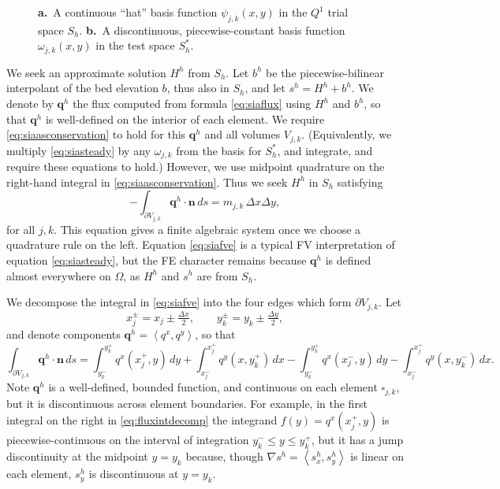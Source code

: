 \documentclass[twocolumn]{igs}
\newcommand\bn{\mathbf{n}}
\newcommand\bq{\mathbf{q}}
\newcommand{\grad}{\nabla}
\newcommand{\ip}[2]{\ensuremath{\left<#1,#2\right>}}
\newcommand{\dxtwo}{\tfrac{\Delta x}{2}}
\newcommand{\dytwo}{\tfrac{\Delta y}{2}}
\begin{document}
\begin{figure}[ht]
\begin{center}
 \quad 
\end{center}
\caption{{\large \textbf{a.}}~A continuous ``hat'' basis function $\psi_{j,k}(x,y)$ in the $Q^1$ trial space $S_h$.  {\large \textbf{b.}}~A discontinuous, piecewise-constant basis function $\omega_{j,k}(x,y)$ in the test space $S_h^*$.}
\label{fig:fembases}
\end{figure}

We seek an approximate solution $H^h$ from $S_h$.  Let $b^h$ be the piecewise-bilinear interpolant of the bed elevation $b$, thus also in $S_h$, and let $s^h=H^h+b^h$.  We denote by $\bq^h$ the flux computed from formula \eqref{eq:siaflux} using $H^h$ and $b^h$, so that $\bq^h$ is well-defined on the interior of each element.  We require \eqref{eq:siaasconservation} to hold for this $\bq^h$ and all volumes $V_{j,k}$.  (Equivalently, we multiply \eqref{eq:siasteady} by any $\omega_{j,k}$ from the basis for $S_h^*$, and integrate, and require these equations to hold.)  However, we use midpoint quadrature on the right-hand integral in \eqref{eq:siaasconservation}.  Thus we seek $H^h$ in $S_h$ satisfying
\begin{equation}
  - \int_{\partial V_{j,k}} \bq^h \cdot \bn\,ds = m_{j,k}\, \Delta x \Delta y, \label{eq:siafve}
\end{equation}
for all $j,k$.  This equation gives a finite algebraic system once we choose a quadrature rule on the left.  Equation \eqref{eq:siafve} is a typical FV interpretation of equation \eqref{eq:siasteady}, but the FE character remains because $\bq^h$ is defined almost everywhere on $\Omega$, as $H^h$ and $s^h$ are from $S_h$.

We decompose the integral in \eqref{eq:siafve} into the four edges which form $\partial V_{j,k}$.  Let
\begin{equation}
x_j^\pm = x_j \pm \dxtwo, \qquad y_k^\pm = y_k \pm \dytwo, \label{eq:definexypm}
\end{equation}
and denote components $\bq^h = \ip{q^x}{q^y}$, so that
\begin{equation}
  \int_{\partial V_{j,k}} \bq^h \cdot \bn\,ds = \int_{y_k^-}^{y_k^+} q^x(x_j^+,y)\,dy + \int_{x_j^-}^{x_j^+} q^y(x,y_k^+)\,dx - \int_{y_k^-}^{y_k^+} q^x(x_j^-,y)\,dy - \int_{x_j^-}^{x_j^+} q^y(x,y_k^-)\,dx. \label{eq:fluxintdecomp}
\end{equation}
Note $\bq^h$ is a well-defined, bounded function, and continuous on each element $\square_{j,k}$, but it is discontinuous across element boundaries.  For example, in the first integral on the right in \eqref{eq:fluxintdecomp} the integrand $f(y) = q^x(x_j^+,y)$ is piecewise-continuous on the interval of integration $y_k^- \le y \le y_k^+$, but it has a jump discontinuity at the midpoint $y=y_k$ because, though $\grad s^h = \ip{s^h_x}{s^h_y}$ is linear on each element, $s^h_y$ is discontinuous at $y=y_k$.
\end{document}
